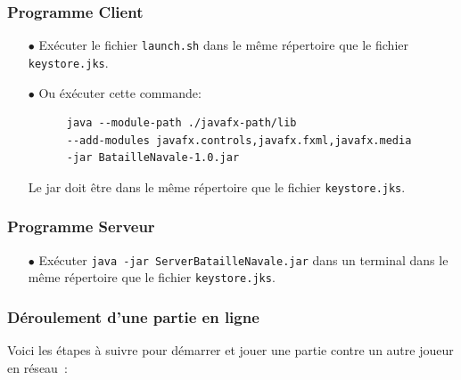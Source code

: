 \documentclass[12pt]{article}
\begin{document}
\subsubsection{Programme Client}
\begin{itemize}
      \item [$\bullet$] Exécuter le fichier \texttt{launch.sh} dans le même
            répertoire que le fichier \texttt{keystore.jks}.
      \item [$\bullet$] Ou éxécuter cette commande:
            \begin{verbatim}
      java --module-path ./javafx-path/lib 
      --add-modules javafx.controls,javafx.fxml,javafx.media 
      -jar BatailleNavale-1.0.jar
      \end{verbatim}
            Le jar doit être dans le même répertoire que le fichier
            \texttt{keystore.jks}.
\end{itemize}

\bigskip

\subsubsection{Programme Serveur}
\begin{itemize}
      \item [$\bullet$] Exécuter \texttt{java -jar ServerBatailleNavale.jar}
            dans un terminal dans le même
            répertoire que le fichier \texttt{keystore.jks}.
\end{itemize}

\bigskip

\subsubsection{Déroulement d'une partie en ligne}

Voici les étapes à suivre pour démarrer et jouer une partie contre un autre
joueur en réseau :
\end{document}
